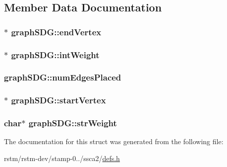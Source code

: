 \subsection{Member Data Documentation}
\hypertarget{structgraphSDG_a01b376c08140c3924d45b02c18af08fb}{
\subsubsection[{end\-Vertex}]{$\ast$ graph\-S\-D\-G\-::end\-Vertex}}\label{structgraphSDG_a01b376c08140c3924d45b02c18af08fb}
\hypertarget{structgraphSDG_ae8a9e6304f35e933100403b32314d546}{
\subsubsection[{int\-Weight}]{$\ast$ graph\-S\-D\-G\-::int\-Weight}}\label{structgraphSDG_ae8a9e6304f35e933100403b32314d546}
\hypertarget{structgraphSDG_a88c2b749529e21812025588b679f74ae}{
\subsubsection[{num\-Edges\-Placed}]{ graph\-S\-D\-G\-::num\-Edges\-Placed}}\label{structgraphSDG_a88c2b749529e21812025588b679f74ae}
\hypertarget{structgraphSDG_a2d4d5a9d81aadcf57fa4e109268e488e}{
\subsubsection[{start\-Vertex}]{$\ast$ graph\-S\-D\-G\-::start\-Vertex}}\label{structgraphSDG_a2d4d5a9d81aadcf57fa4e109268e488e}
\hypertarget{structgraphSDG_a4ea8dc332c157359a35b7a31119a178b}{
\subsubsection[{str\-Weight}]{\setlength{\rightskip}{0pt plus 5cm}char$\ast$ graph\-S\-D\-G\-::str\-Weight}}\label{structgraphSDG_a4ea8dc332c157359a35b7a31119a178b}


The documentation for this struct was generated from the following file\-:\begin{DoxyCompactItemize}
\item 
rstm/rstm-\/dev/stamp-\/0../ssca2/\hyperlink{defs_8h}{defs.\-h}\end{DoxyCompactItemize}
